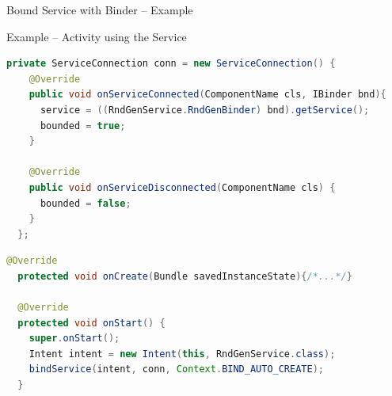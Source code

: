 \documentclass{beamer}
\begin{document}
\begin{frame}{Bound Service with Binder -- Example}
\begin{exampleblock}{Example -- Activity using the Service}
\begin{lstlisting}[language=Java]
  private ServiceConnection conn = new ServiceConnection() {
    @Override
    public void onServiceConnected(ComponentName cls, IBinder bnd){
      service = ((RndGenService.RndGenBinder) bnd).getService();
      bounded = true;
    }

    @Override
    public void onServiceDisconnected(ComponentName cls) {
      bounded = false;
    }
  };
      \end{lstlisting}
    \end{exampleblock}  
    \begin{exampleblock}{\vspace{-10pt}}
      \begin{lstlisting}[language=Java]   
  @Override
  protected void onCreate(Bundle savedInstanceState){/*...*/}

  @Override
  protected void onStart() {
    super.onStart();
    Intent intent = new Intent(this, RndGenService.class);
    bindService(intent, conn, Context.BIND_AUTO_CREATE);
  }


\end{lstlisting}
\end{exampleblock}
\end{frame}
\end{document}
